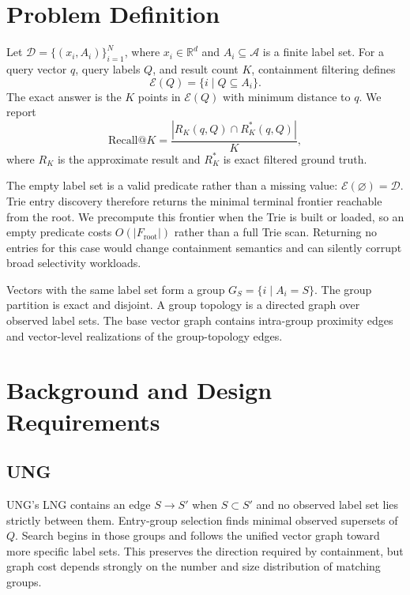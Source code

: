 \documentclass[sigconf,review,anonymous]{acmart}
\newcommand{\dataset}{\mathcal{D}}
\newcommand{\labels}{\mathcal{A}}
\newcommand{\eligible}{\mathcal{E}}
\begin{document}
\section{Problem Definition}
Let $\dataset=\{(x_i,A_i)\}_{i=1}^{N}$, where $x_i\in\mathbb{R}^d$ and
$A_i\subseteq\labels$ is a finite label set.  For a query vector $q$, query
labels $Q$, and result count $K$, containment filtering defines
\begin{equation}
  \eligible(Q)=\{i\mid Q\subseteq A_i\}.
\end{equation}
The exact answer is the $K$ points in $\eligible(Q)$ with minimum distance to
$q$.  We report
\begin{equation}
  \mathrm{Recall@}K = \frac{|R_K(q,Q)\cap R^*_K(q,Q)|}{K},
\end{equation}
where $R_K$ is the approximate result and $R^*_K$ is exact filtered ground
truth.

The empty label set is a valid predicate rather than a missing value:
$\eligible(\varnothing)=\dataset$.  Trie entry discovery therefore returns the
minimal terminal frontier reachable from the root.  We precompute this
frontier when the Trie is built or loaded, so an empty predicate costs
$O(|F_{\mathrm{root}}|)$ rather than a full Trie scan.  Returning no entries for
this case would change containment semantics and can silently corrupt broad
selectivity workloads.

Vectors with the same label set form a group $G_S=\{i\mid A_i=S\}$.  The
group partition is exact and disjoint.  A group topology is a directed graph
over observed label sets.  The base vector graph contains intra-group
proximity edges and vector-level realizations of the group-topology edges.

\section{Background and Design Requirements}
\subsection{UNG}
UNG's LNG contains an edge $S\rightarrow S'$ when $S\subset S'$ and no
observed label set lies strictly between them.  Entry-group selection finds
minimal observed supersets of $Q$.  Search begins in those groups and follows
the unified vector graph toward more specific label sets.  This preserves the
direction required by containment, but graph cost depends strongly on the
number and size distribution of matching groups.
\end{document}
